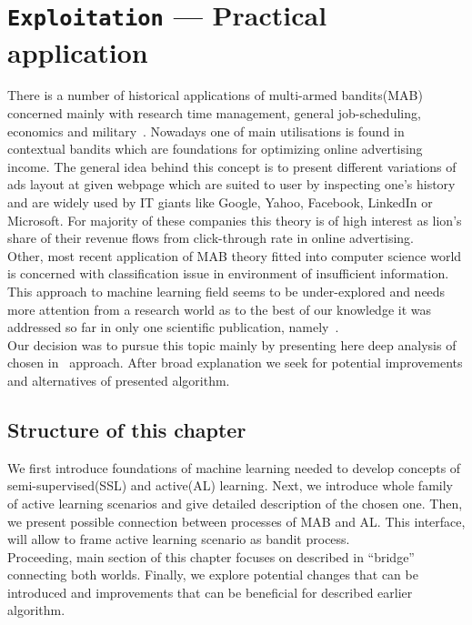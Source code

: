 \documentclass[12pt, a4paper, pdflatex]{report}
\begin{document}
\chapter{\texttt{\textbf{Exploitation}} --- Practical application}

There is a number of historical applications of multi-armed bandits(MAB) concerned mainly with research time management, general job-scheduling, economics and military~\cite{gittins+glazebrook+weber}.
Nowadays one of main utilisations is found in contextual bandits which are foundations for optimizing online advertising income. The general idea behind this concept is to present different variations of ads layout at given webpage which are suited to user by inspecting one's history and are widely used by IT giants like Google, Yahoo, Facebook, LinkedIn or Microsoft. For majority of these companies this theory is of high interest as lion's share of their revenue flows from click-through rate in online advertising.~\cite{graepel2010web, Scott:2010:MBL:1944422.1944432}\\

Other, most recent application of MAB theory fitted into computer science world is concerned with classification issue in environment of insufficient information. This approach to machine learning field seems to be under-explored and needs more attention from a research world as to the best of our knowledge it was addressed so far in only one scientific publication, namely~\cite{DBLP:journals/corr/GantiG13}.\\
Our decision was to pursue this topic mainly by presenting here deep analysis of chosen in~\cite{DBLP:journals/corr/GantiG13} approach. After broad explanation we seek for potential improvements and alternatives of presented algorithm.

\section{Structure of this chapter}
We first introduce foundations of machine learning needed to develop concepts of semi-supervised(SSL) and active(AL) learning. Next, we introduce whole family of active learning scenarios and give detailed description of the chosen one. Then, we present possible connection between processes of MAB and AL. This interface, will allow to frame active learning scenario as bandit process.\\
Proceeding, main section of this chapter focuses on described in \cite{DBLP:journals/corr/GantiG13} ``bridge'' connecting both worlds. Finally, we explore potential changes that can be introduced and improvements that can be beneficial for described earlier algorithm.
\end{document}
